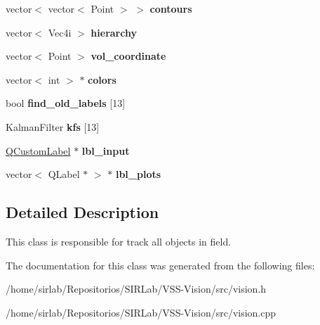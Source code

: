 \begin{DoxyCompactItemize}
\item 
\hypertarget{classvision_a77ade58544c4db2587686e73d227cc37}{vector$<$ vector$<$ Point $>$ $>$ {\bfseries contours}}\label{classvision_a77ade58544c4db2587686e73d227cc37}

\item 
\hypertarget{classvision_a04a535405c5d7b076299073194f497b4}{vector$<$ Vec4i $>$ {\bfseries hierarchy}}\label{classvision_a04a535405c5d7b076299073194f497b4}

\item 
\hypertarget{classvision_a4f28ab3ac6e168aa977725da1973399b}{vector$<$ Point $>$ {\bfseries vol\-\_\-coordinate}}\label{classvision_a4f28ab3ac6e168aa977725da1973399b}

\item 
\hypertarget{classvision_a7a1ac84ff70026be06b4ffe17fb0f3aa}{vector$<$ int $>$ $\ast$ {\bfseries colors}}\label{classvision_a7a1ac84ff70026be06b4ffe17fb0f3aa}

\item 
\hypertarget{classvision_a08b91dbb2384d4c6bd78560ec6621246}{bool {\bfseries find\-\_\-old\-\_\-labels} \mbox{[}13\mbox{]}}\label{classvision_a08b91dbb2384d4c6bd78560ec6621246}

\item 
\hypertarget{classvision_a76bf5d0bd645d4db2d9535bacae1284f}{Kalman\-Filter {\bfseries kfs} \mbox{[}13\mbox{]}}\label{classvision_a76bf5d0bd645d4db2d9535bacae1284f}

\item 
\hypertarget{classvision_ae925689fd0bd2eb2fcf2159e2f7b251e}{\hyperlink{classQCustomLabel}{Q\-Custom\-Label} $\ast$ {\bfseries lbl\-\_\-input}}\label{classvision_ae925689fd0bd2eb2fcf2159e2f7b251e}

\item 
\hypertarget{classvision_a4ec174995015376fcc9c15add83ed422}{vector$<$ Q\-Label $\ast$ $>$ $\ast$ {\bfseries lbl\-\_\-plots}}\label{classvision_a4ec174995015376fcc9c15add83ed422}

\end{DoxyCompactItemize}


\subsection{Detailed Description}
This class is responsible for track all objects in field. 

The documentation for this class was generated from the following files\-:\begin{DoxyCompactItemize}
\item 
/home/sirlab/\-Repositorios/\-S\-I\-R\-Lab/\-V\-S\-S-\/\-Vision/src/vision.\-h\item 
/home/sirlab/\-Repositorios/\-S\-I\-R\-Lab/\-V\-S\-S-\/\-Vision/src/vision.\-cpp\end{DoxyCompactItemize}
